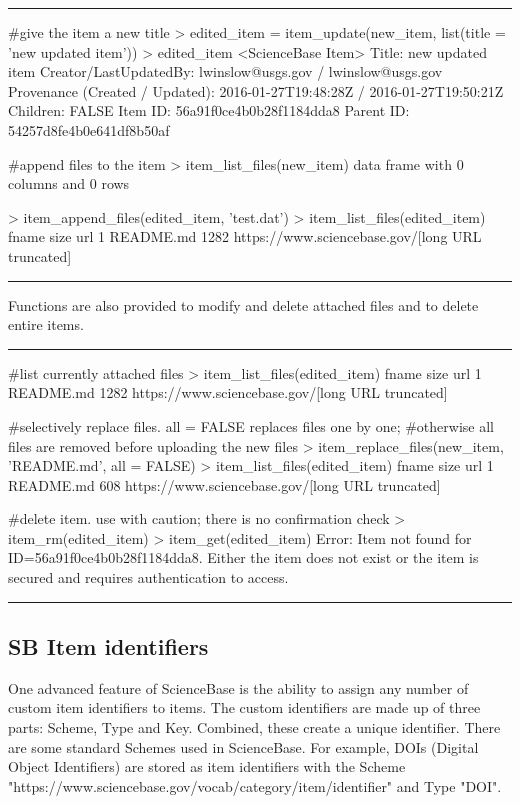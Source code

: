 \noindent\rule{\textwidth}{0.4pt}
\begin{example}
#give the item a new title
> edited_item = item_update(new_item, list(title = 'new updated item'))
> edited_item
<ScienceBase Item>
  Title: new updated item
  Creator/LastUpdatedBy:     lwinslow@usgs.gov / lwinslow@usgs.gov
  Provenance (Created / Updated):  2016-01-27T19:48:28Z / 2016-01-27T19:50:21Z
  Children: FALSE
  Item ID: 56a91f0ce4b0b28f1184dda8
  Parent ID: 54257d8fe4b0e641df8b50af

#append files to the item
> item_list_files(new_item)
data frame with 0 columns and 0 rows

> item_append_files(edited_item, 'test.dat')
> item_list_files(edited_item)
      fname size     url
1 README.md 1282     https://www.sciencebase.gov/[long URL truncated]
\end{example}
\noindent\rule{\textwidth}{0.4pt}

Functions are also provided to modify and delete attached files and to delete
entire items.

\noindent\rule{\textwidth}{0.4pt}
\begin{example}
#list currently attached files
> item_list_files(edited_item)
      fname size     url
1 README.md 1282     https://www.sciencebase.gov/[long URL truncated]

#selectively replace files. all = FALSE replaces files one by one;
#otherwise all files are removed before uploading the new files
> item_replace_files(new_item, 'README.md', all = FALSE)
> item_list_files(edited_item)
      fname size     url
1 README.md 608     https://www.sciencebase.gov/[long URL truncated]

#delete item. use with caution; there is no confirmation check
> item_rm(edited_item)
> item_get(edited_item)
Error: Item not found for ID=56a91f0ce4b0b28f1184dda8. Either the item does
not exist or the item is secured and requires authentication to access.
\end{example}
\noindent\rule{\textwidth}{0.4pt}

\subsection{SB Item identifiers}
One advanced feature of ScienceBase is the ability to assign any
number of custom item identifiers to items. The custom identifiers are made up
of three parts: Scheme, Type and Key. Combined, these create a unique identifier.
There are some standard Schemes used in ScienceBase. For example, DOIs (Digital
Object Identifiers) are stored as item identifiers with the Scheme \\
"https://www.sciencebase.gov/vocab/category/item/identifier" and Type "DOI".

